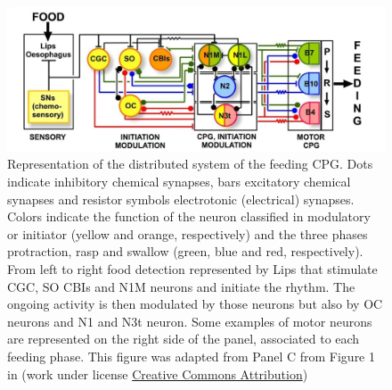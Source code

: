 \begin{figure}[bth!]
	\centering
	\includegraphics[width=\textwidth]{img/invariants/distributed_benjamin_2012.pdf}
	\caption{Representation of the distributed system of the feeding CPG. Dots indicate inhibitory chemical synapses, bars excitatory chemical synapses and resistor symbols electrotonic (electrical) synapses. Colors indicate the function of the neuron classified in modulatory or initiator (yellow and orange, respectively) and the three phases protraction, rasp and swallow (green, blue and red, respectively). From left to right food detection represented by Lips that stimulate CGC, SO CBIs and N1M neurons and initiate the rhythm. The ongoing activity is then modulated by those neurons but also by OC neurons and N1 and N3t neuron. Some examples of motor neurons are represented on the right side of the panel, associated to each feeding phase. This figure was adapted from Panel C from Figure 1 in \cite{benjamin_distributed_2012} (work under license \href{http://creativecommons.org/licenses/by/2.0}{Creative Commons Attribution})}
	\label{fig:feeding distribution}%
\end{figure}


